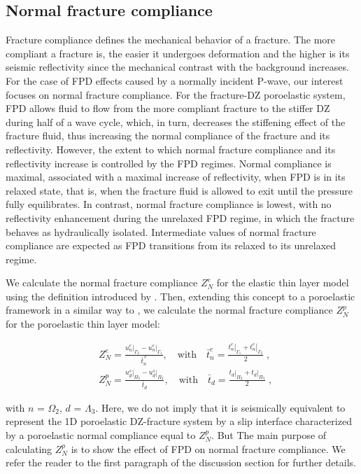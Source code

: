 \documentclass[draft]{agujournal2019}
\begin{document}
\subsection{Normal fracture compliance}
Fracture compliance defines the mechanical behavior of a fracture. The more compliant a fracture is, the easier it undergoes deformation and the higher is its seismic reflectivity since the mechanical contrast with the background increases. For the case of FPD effects caused by a normally incident P-wave, our interest focuses on normal fracture compliance. For the fracture-DZ poroelastic system, FPD  allows fluid to flow from the more compliant fracture to the stiffer DZ during half of a wave cycle, which, in turn, decreases the stiffening effect of the fracture fluid, thus 
increasing the normal compliance of the fracture and its reflectivity.
However, the extent to which normal fracture compliance and its reflectivity increase
is controlled by the FPD regimes. Normal compliance is maximal, associated with a maximal increase of reflectivity, when FPD is in its relaxed state, that is, when the fracture fluid is allowed to exit until the pressure fully equilibrates. In contrast,  normal fracture compliance is lowest, with no reflectivity enhancement during the unrelaxed FPD regime, in which the fracture behaves as hydraulically isolated. Intermediate values of normal fracture compliance are expected as FPD transitions from its relaxed to its unrelaxed regime.

We calculate the normal fracture compliance  $Z_N^e$ for the elastic thin layer model using the definition introduced by . Then, extending this concept to a poroelastic framework in a similar way to , we calculate the normal fracture compliance $Z_N^p$ for the poroelastic thin layer model:
\begin{linenomath*}
\begin{equation}\label{Eq.22}
\begin{split}
& Z_N^e =  \frac{ \left.u_{n}^e \right \rvert_{\Gamma_2} - \left.u_{n}^e \right \rvert_{\Gamma_1}}{\bar t^{\,e}_n},  \quad \text{with} \quad
\bar t^{e}_{n} = \frac{ \left.t^{e}_{n} \right \rvert_{\Gamma_1}+ \left.t^{e}_n \right \rvert_{\Gamma_2}}{2}\; , \\
& Z_N^p =  \frac{ \left.u_{d }^s \right \rvert_{\Pi_3} - \left.u_{d}^s \right \rvert_{\Pi_2}}{\bar t_d},  \quad \text{with} \quad
\bar t_{d} = \frac{ \left.t_{d} \right \rvert_{\Pi_2}+ \left.t_{d} \right \rvert_{\Pi_3}}{2} \;,
\end{split}
\end{equation} 
\end{linenomath*}
with $n$ = $\Omega_2$, $d$ = $\Lambda_3$.
Here, we do not imply that it is seismically equivalent to represent the 1D poroelastic DZ-fracture system by a slip interface characterized by a  poroelastic normal compliance equal to $Z_N^p$. But The main purpose of calculating $Z_N^p$ is to show the effect of FPD on normal fracture compliance. We refer the reader to the first paragraph of the discussion section for further details.
\end{document}

